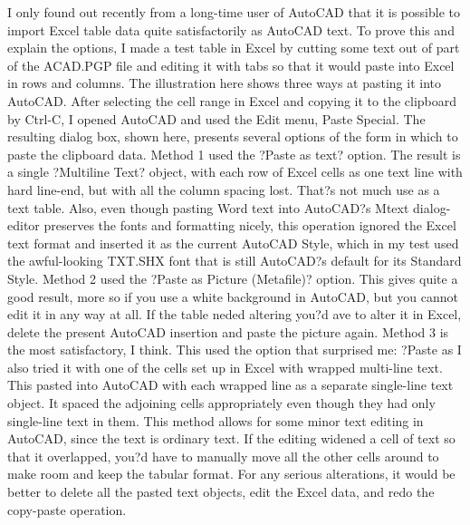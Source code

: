 \documentclass[a4paper]{article}
\begin{document}
I only found out recently from a long-time user of AutoCAD that it is possible to import Excel table data quite satisfactorily as AutoCAD text. To prove this and explain the options, I made a test table in Excel by cutting some text out of part of the ACAD.PGP file and editing it with tabs so that it would paste into Excel in rows and columns. The illustration here shows three ways at pasting it into AutoCAD. After selecting the cell range in Excel and copying it to the clipboard by Ctrl-C, I opened AutoCAD and used the Edit menu, Paste Special. The resulting dialog box, shown here, presents several options of the form in which to paste the clipboard data.
Method 1 used the ?Paste as text? option. The result is a single ?Multiline Text? object, with each row of Excel cells as one text line with hard line-end, but with all the column spacing lost. That?s not much use as a text table. Also, even though pasting Word text into AutoCAD?s Mtext dialog-editor preserves the fonts and formatting nicely, this operation ignored the Excel text format and inserted it as the current AutoCAD Style, which in my test used the awful-looking TXT.SHX font that is still AutoCAD?s default for its Standard Style.
Method 2 used the ?Paste as Picture (Metafile)? option. This gives quite a good result, more so if you use a white background in AutoCAD, but you cannot edit it in any way at all. If the table neded altering you?d ave to alter it in Excel, delete the present AutoCAD insertion and paste the picture again.
Method 3 is the most satisfactory, I think. This used the option that surprised me: ?Paste as %
I also tried it with one of the cells set up in Excel with wrapped multi-line text. This pasted into AutoCAD with each wrapped line as a separate single-line text object. It spaced the adjoining cells appropriately even though they had only single-line text in them.
This method allows for some minor text editing in AutoCAD, since the text is ordinary text. If the editing widened a cell of text so that it overlapped, you?d have to manually move all the other cells around to make room and keep the tabular format. For any serious alterations, it would be better to delete all the pasted text objects, edit the Excel data, and redo the copy-paste operation.
\end{document}
